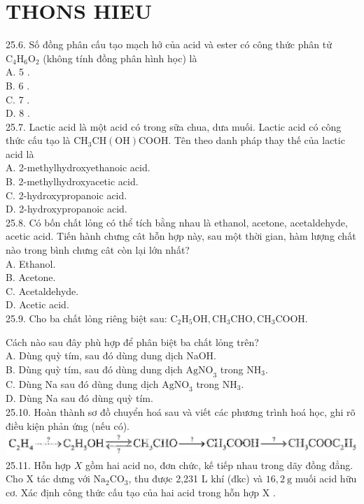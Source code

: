 \documentclass[10pt]{article}
\begin{document}
\section*{THONS HIEU}
25.6. Số đồng phân cấu tạo mạch hở của acid và ester có công thức phân tử $\mathrm{C}_{4} \mathrm{H}_{6} \mathrm{O}_{2}$ (không tính đồng phân hình học) là\\
A. 5 .\\
B. 6 .\\
C. 7 .\\
D. 8 .\\
25.7. Lactic acid là một acid có trong sữa chua, dưa muối. Lactic acid có công thức cấu tạo là $\mathrm{CH}_{3} \mathrm{CH}(\mathrm{OH}) \mathrm{COOH}$. Tên theo danh pháp thay thế của lactic acid là\\
A. 2-methylhydroxyethanoic acid.\\
B. 2-methylhydroxyacetic acid.\\
C. 2-hydroxypropanoic acid.\\
D. 2-hydroxypropanoic acid.\\
25.8. Có bốn chất lỏng có thể tích bằng nhau là ethanol, acetone, acetaldehyde, acetic acid. Tiến hành chưng cât hỗn hợp này, sau một thời gian, hàm lượng chất nào trong bình chưng cât còn lại lớn nhất?\\
A. Ethanol.\\
B. Acetone.\\
C. Acetaldehyde.\\
D. Acetic acid.\\
25.9. Cho ba chất lỏng riêng biệt sau: $\mathrm{C}_{2} \mathrm{H}_{5} \mathrm{OH}, \mathrm{CH}_{3} \mathrm{CHO}, \mathrm{CH}_{3} \mathrm{COOH}$.

Cách nào sau đây phù hợp để phân biệt ba chất lỏng trên?\\
A. Dùng quỳ tím, sau đó dùng dung dịch NaOH.\\
B. Dùng quỳ tím, sau đó dùng dung dịch $\mathrm{AgNO}_{3}$ trong $\mathrm{NH}_{3}$.\\
C. Dùng Na sau đó dùng dung dịch $\mathrm{AgNO}_{3}$ trong $\mathrm{NH}_{3}$.\\
D. Dùng Na sau đó dùng quỳ tím.\\
25.10. Hoàn thành sơ đồ chuyển hoá sau và viết các phương trình hoá học, ghi rõ điều kiện phản ứng (nếu có).\\
\includegraphics[max width=\textwidth, center]{2025_10_23_fa9073eecee116ad8cf2g-89}\\
25.11. Hỗn hợp $X$ gồm hai acid no, đơn chức, kế tiếp nhau trong dãy đồng đẳng. Cho X tác dưng với $\mathrm{Na}_{2} \mathrm{CO}_{3}$, thu được 2,231 L khí (đkc) và $16,2 \mathrm{~g}$ muối acid hữu cơ. Xác định công thức cấu tạo của hai acid trong hỗn hợp X .
\end{document}
